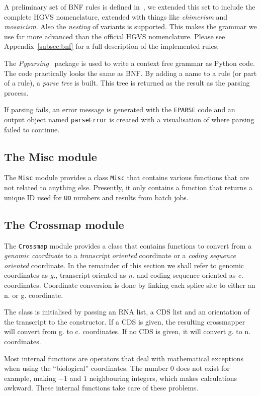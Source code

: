 \documentclass{article}
\begin{document}
A preliminary set of BNF rules is defined in~\cite{BNF}, we extended this set
to include the complete HGVS nomenclature, extended with things like
\emph{chimerism} and \emph{mosaicism}. Also the \emph{nesting} of variants is
supported. This makes the grammar we use far more advanced than the official
HGVS nomenclature. Please see Appendix~\ref{subsec:bnf} for a full description
of the implemented rules.

The \emph{Pyparsing}~\cite{PYPARSING} package is used to write a context free
grammar as Python code. The code practically looks the same as BNF. By adding a
name to a rule (or part of a rule), a \emph{parse tree} is built. This tree is
returned as the result as the parsing process.

If parsing fails, an error message is generated with the \texttt{EPARSE} code
and an output object named \texttt{parseError} is created with a visualisation
of where parsing failed to continue.

\subsection{The Misc module} \label{subsec:misc}
The \texttt{Misc} module provides a class \texttt{Misc} that contains various
functions that are not related to anything else. Presently, it only contains
a function that returns a unique ID used for \texttt{UD} numbers and results
from batch jobs.

\subsection{The Crossmap module} \label{subsec:crossmap}
The \texttt{Crossmap} module provides a class that contains functions to
convert from a \emph{genomic coordinate} to a \emph{transcript oriented}
coordinate or a \emph{coding sequence oriented} coordinate. In the remainder
of this section we shall refer to genomic coordinates as \emph{g.}, transcript oriented as \emph{n.} and coding sequence oriented as \emph{c.} coordinates.
Coordinate conversion is done by linking each splice site to either an n. or
g. coordinate. 

The class is initialised by passing an RNA list, a CDS list and an orientation
of the transcript to the constructor. If a CDS is given, the resulting
crossmapper will convert from g. to c. coordinates. If no CDS is given, it will
convert g. to n. coordinates. 

Most internal functions are operators that deal with mathematical exceptions
when using the ``biological'' coordinates. The number $0$ does not exist for
example, making $-1$ and $1$ neighbouring integers, which makes calculations
awkward. These internal functions take care of these problems.
\end{document}
